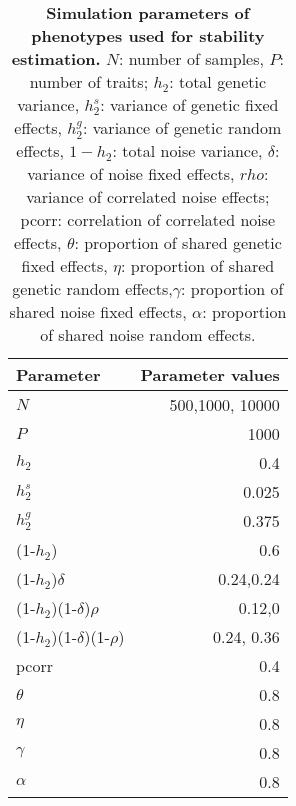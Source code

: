 \begin{table}[h]
  \centering
  \caption[\textbf{Simulation parameters of phenotypes used for stability estimation. }]{\textbf{Simulation parameters of phenotypes used for stability estimation. }\(N\): number of samples, \(P\): number of traits; \(h_2\): total genetic variance, \(h_2^s\): variance of genetic  fixed effects, \(h_2^g\): variance of genetic random effects, \(1 - h_2\): total noise variance, \(\delta\): variance of noise fixed effects, \(rho\): variance of correlated noise effects; pcorr: correlation of correlated noise effects, \(\theta\): proportion of shared genetic fixed effects, \(\eta\):  proportion of shared genetic random effects,\(\gamma\): proportion of shared noise fixed effects, \(\alpha\): proportion of shared noise random effects.}
    \begin{tabular}{lr}
    \toprule
    Parameter & Parameter values \\
    \midrule
    \(N\) & \num{500},\num{1000}, \num{10000} \\
    \(P\) & \num{1000} \\
    \addlinespace[1.5ex]
    \(h_2\) & 0.4 \\
    \(h_2^s\) & 0.025 \\
    \(h_2^g\) & 0.375 \\
   \addlinespace[1.5ex]
    (1-\(h_2\)) & 0.6 \\
    (1-\(h_2\))\(\delta\) & 0.24,0.24 \\
    (1-\(h_2\))(1-\(\delta\))\(\rho\) & 0.12,0 \\
    (1-\(h_2\))(1-\(\delta\))(1-\(\rho\)) & 0.24, 0.36 \\
   \addlinespace[1.5ex]
    pcorr & 0.4 \\
    \(\theta\) & 0.8 \\
    \(\eta\) & 0.8 \\
    \(\gamma\) & 0.8 \\
    \(\alpha\) & 0.8 \\
    \bottomrule
    \end{tabular}%
  \label{tab:parametersSimulationDimRed}%
\end{table}%


